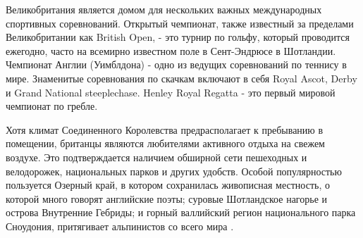 Великобритания является домом для нескольких важных международных спортивных соревнований. Открытый чемпионат, также известный за пределами Великобритании как British Open, - это турнир по гольфу, который проводится ежегодно, часто на всемирно известном поле в Сент-Эндрюсе в Шотландии. Чемпионат Англии (Уимблдона) - одно из ведущих соревнований по теннису в мире. Знаменитые соревнования по скачкам включают в себя Royal Ascot, Derby и Grand National steeplechase. Henley Royal Regatta - это первый мировой чемпионат по гребле.

Хотя климат Соединенного Королевства предрасполагает к пребыванию в помещении, британцы являются любителями активного отдыха на свежем воздухе. Это подтверждается наличием обширной сети пешеходных и велодорожек, национальных парков и других удобств. Особой популярностью пользуется Озерный край, в котором сохранилась живописная местность, о которой много говорят английские поэты; суровые Шотландское нагорье и острова Внутренние Гебриды; и горный валлийский регион национального парка Сноудония, притягивает альпинистов со всего мира \cite{britannica}.